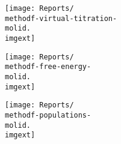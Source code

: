 \documentclass[9pt]{standalone}
\begin{document}
\begin{minipage}[s]{\textwidth}\centering
{\textbf \methodf}
\end{minipage}

\noindent
\begin{minipage}[s]{0.33\textwidth}\centering
\texttt{[image: Reports/\\methodf-virtual-titration-\\molid.\\imgext]}
\end{minipage}
\begin{minipage}[s]{0.33\textwidth}
\texttt{[image: Reports/\\methodf-free-energy-\\molid.\\imgext]}
\end{minipage}
\begin{minipage}[s]{0.33\textwidth}
\texttt{[image: Reports/\\methodf-populations-\\molid.\\imgext]}
\end{minipage}
\end{document}

